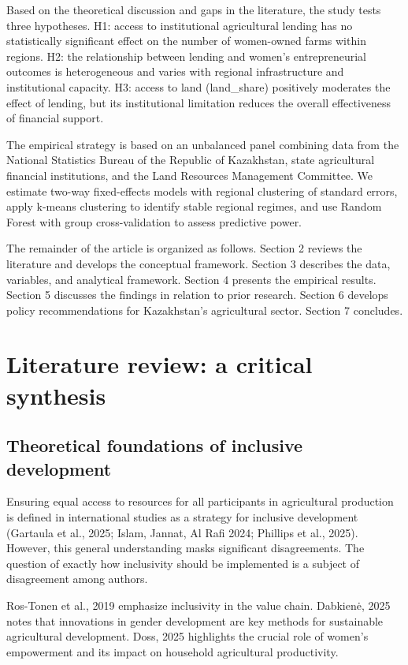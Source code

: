 ﻿\documentclass[sn-mathphys-num]{sn-jnl}
\newcommand{\hl}[1]{#1}
\begin{document}
Based on the theoretical discussion and gaps in the literature, the study tests three hypotheses. H1: access to institutional agricultural lending has no statistically significant effect on the number of women-owned farms within regions. H2: the relationship between lending and women's entrepreneurial outcomes is heterogeneous and varies with regional infrastructure and institutional capacity. H3: access to land (land\_share) positively moderates the effect of lending, but its institutional limitation reduces the overall effectiveness of financial support.

The empirical strategy is based on an unbalanced panel combining data from the National Statistics Bureau of the Republic of Kazakhstan, state agricultural financial institutions, and the Land Resources Management Committee. We estimate two-way fixed-effects models with regional clustering of standard errors, apply k-means clustering to identify stable regional regimes, and use Random Forest with group cross-validation to assess predictive power.

The remainder of the article is organized as follows. Section 2 reviews the literature and develops the conceptual framework. Section 3 describes the data, variables, and analytical framework. Section 4 presents the empirical results. Section 5 discusses the findings in relation to prior research. Section 6 develops policy recommendations for Kazakhstan's agricultural sector. Section 7 concludes.

\section{Literature review: a critical synthesis}

\subsection{Theoretical foundations of inclusive development}

Ensuring equal access to resources for all participants in agricultural
production is defined in international studies as a strategy for
inclusive development (\hl{Gartaula et al., 2025; Islam, Jannat, Al Rafi
2024; Phillips et al., 2025).} However, this general understanding masks
significant disagreements. The question of exactly how inclusivity
should be implemented is a subject of disagreement among authors.

\hl{Ros-Tonen et al., 2019} emphasize inclusivity in the value chain.
\hl{Dabkienė, 2025} notes that innovations in gender development are key
methods for sustainable agricultural development. \hl{Doss, 2025}
highlights the crucial role of women's empowerment and its impact on
household agricultural productivity.
\end{document}
